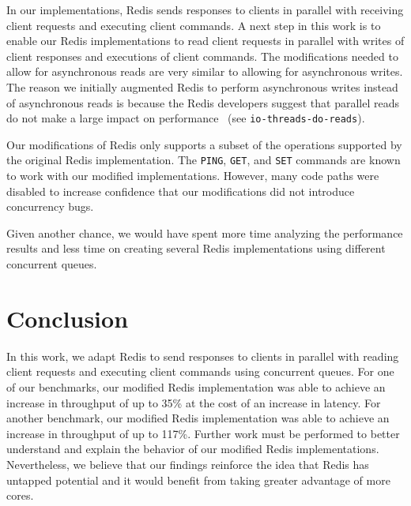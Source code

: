 \documentclass[sigconf, screen]{acmart}
\newcommand{\inlinecode}[1]{\texttt{#1}}
\begin{document}
In our implementations, Redis sends responses to clients in parallel with receiving client requests and executing client commands.
A next step in this work is to enable our Redis implementations to read client requests in parallel with writes of client responses and executions of client commands.
The modifications needed to allow for asynchronous reads are very similar to allowing for asynchronous writes.
The reason we initially augmented Redis to perform asynchronous writes instead of asynchronous reads is because the Redis developers suggest that parallel reads do not make a large impact on performance~\cite{redis-io-threads-do-reads} (see \inlinecode{io-threads-do-reads}).


Our modifications of Redis only supports a subset of the operations supported by the original Redis implementation.
The \inlinecode{PING}, \inlinecode{GET}, and \inlinecode{SET} commands are known to work with our modified implementations.
However, many code paths were disabled to increase confidence that our modifications did not introduce concurrency bugs.

Given another chance, we would have spent more time analyzing the performance results and less time on creating several Redis implementations using different concurrent queues.

\section{Conclusion}
In this work, we adapt Redis to send responses to clients in parallel with reading client requests and executing client commands using concurrent queues.
For one of our benchmarks, our modified Redis implementation was able to achieve an increase in throughput of up to 35\% at the cost of an increase in latency.
For another benchmark, our modified Redis implementation was able to achieve an increase in throughput of up to 117\%.
Further work must be performed to better understand and explain the behavior of our modified Redis implementations.
Nevertheless, we believe that our findings reinforce the idea that Redis has untapped potential and it would benefit from taking greater advantage of more cores.

\end{document}

